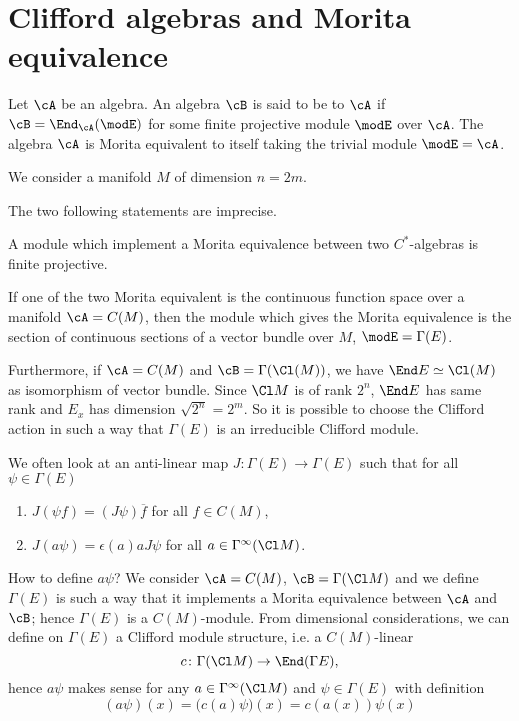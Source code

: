 \section{Clifford algebras and Morita equivalence}

Let $\cA$ be an algebra. An algebra $\cB$ is said to be \label{PgMoritaEq} to $\cA$ if $\cB=\End_{\cA}(\modE)$ for some finite projective module $\modE$ over $\cA$. The algebra $\cA$ is Morita equivalent to itself taking the trivial module $\modE=\cA$.

We consider a manifold $M$ of dimension $n=2m$.

\begin{probleme}
	The two following statements are imprecise.
\end{probleme}

\begin{proposition}
A module which implement a Morita equivalence between two $C^*$-algebras is finite projective.
\end{proposition}

\begin{theorem}
If one of the two Morita equivalent is the continuous function space over a manifold $\cA=C(M)$, then the module which gives the Morita equivalence is the section of continuous sections of a vector bundle over $M$, $\modE=\Gamma(E)$.
\end{theorem}
Furthermore, if $\cA=C(M)$ and $\cB=\Gamma(\Cl(M))$, we have $\End E\simeq \Cl(M)$ as isomorphism of vector bundle. Since $\Cl M$ is of rank $2^n$, $\End E$ has same rank and $E_x$ has dimension $\sqrt{2^n}=2^m$. So it is possible to choose the Clifford action in such a way that $\Gamma(E)$ is an irreducible Clifford module.

We often look at an anti-linear map $J\colon \Gamma(E)\to \Gamma(E)$ such that for all $\psi\in\Gamma(E)$
\begin{enumerate}
\item $J(\psi f)=(J\psi)\overline{ f }$ for all $f\in C(M)$,
\item $J(a\psi)=\epsilon(a)a J\psi$ for all $a\in\Gamma^{\infty}(\Cl M)$.
\end{enumerate}
How to define $a\psi$? We consider $\cA=C(M)$, $\cB=\Gamma(\Cl M)$ and we define $\Gamma(E)$ is such a way that it implements a Morita equivalence between $\cA$ and $\cB$; hence $\Gamma(E)$ is a $C(M)$-module. From dimensional considerations, we can define on $\Gamma(E)$ a Clifford module structure, i.e. a $C(M)$-linear
\begin{equation}
  c\colon \Gamma(\Cl M)\to \End(\Gamma E),
\end{equation}
hence $a\psi$ makes sense for any $a\in\Gamma^{\infty}(\Cl M)$ and $\psi\in\Gamma(E)$ with definition
\begin{equation}
 (a\psi)(x)=\big( c(a)\psi \big)(x)
		=c(a(x))\psi(x)
\end{equation}

